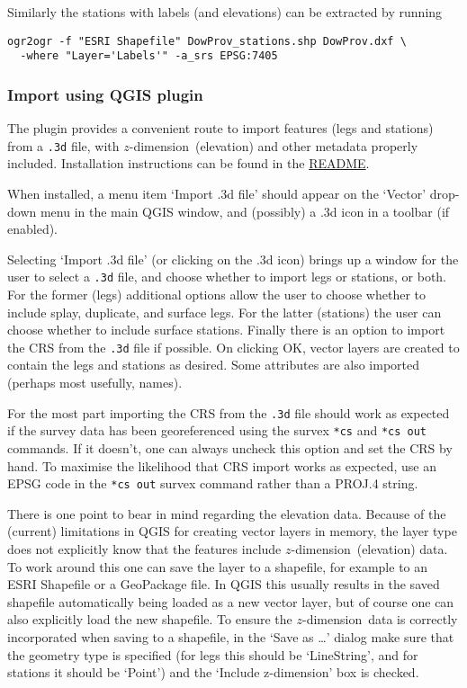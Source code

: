 \documentclass[]{article}
\newcommand{\zdimension}{$z$-dimension}
\begin{document}
Similarly the stations with labels (and elevations) can be extracted by
running

\begin{verbatim}
ogr2ogr -f "ESRI Shapefile" DowProv_stations.shp DowProv.dxf \
  -where "Layer='Labels'" -a_srs EPSG:7405
\end{verbatim}

\subsubsection{Import using QGIS plugin}\label{import-using-qgis-plugin}

The plugin provides a convenient route to import features (legs and
stations) from a \verb}.3d} file, with \zdimension\ (elevation) and
other metadata properly included.  Installation instructions can be
found in the 
\href{https://github.com/patrickbwarren/qgis-survex-import}{README}.

When installed, a menu item `Import .3d file' should appear on the
`Vector' drop-down menu in the main QGIS window, and (possibly) a
.3d icon in a toolbar (if enabled).

Selecting `Import .3d file' (or clicking on the .3d icon) brings up a
window for the user to select a \verb+.3d+ file, and choose whether to
import legs or stations, or both.  For the former (legs) additional
options allow the user to choose whether to include splay, duplicate,
and surface legs.  For the latter (stations) the user can choose
whether to include surface stations.  Finally there is an option to
import the CRS from the \verb+.3d+ file if possible.  On clicking OK,
vector layers are created to contain the legs and stations as desired.
Some attributes are also imported (perhaps most usefully, names).

For the most part importing the CRS from the \verb+.3d+ file should work as
expected if the survey data has been georeferenced using the survex
\verb+*cs+ and \verb+*cs out+ commands.  If it doesn't, one can always uncheck
this option and set the CRS by hand.  To maximise the likelihood that
CRS import works as expected, use an EPSG code in the \verb+*cs out+ survex
command rather than a PROJ.4 string.

There is one point to bear in mind regarding the elevation data.
Because of the (current) limitations in QGIS for creating vector
layers in memory, the layer type does not explicitly know that the
features include \zdimension\ (elevation) data.  To work around this
one can save the layer to a shapefile, for example to an ESRI
Shapefile or a GeoPackage file.  In QGIS this usually results in the
saved shapefile automatically being loaded as a new vector layer, but
of course one can also explicitly load the new shapefile.  To ensure
the \zdimension\ data is correctly incorporated when saving to a
shapefile, in the `Save as \dots'  dialog make sure that the geometry
type is specified (for legs this should be `LineString', and for
stations it should be `Point') and the `Include z-dimension' box is
checked.
\end{document}
